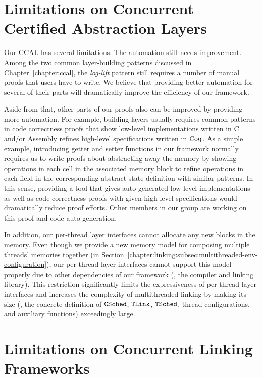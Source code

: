 \section{Limitations on Concurrent Certified Abstraction Layers}

Our CCAL has several limitations.
The automation still needs improvement. Among the two common layer-building patterns discussed in 
Chapter~\ref{chapter:ccal},
the \textit{log-lift} pattern still requires a number of manual proofs that users have to write. 
We believe that providing better automation for several of their parts will dramatically improve the efficiency of our framework.

Aside from that, other parts of our proofs also can be improved by providing more automation. 
For example, building layers usually requires common patterns in code correctness proofs that show low-level implementations written in C and/or Assembly refines high-level specifications written in $\mathrm{Coq}$. 
As a simple example, introducing getter and setter functions in our framework normally requires us to write proofs about abstracting away the memory by showing operations in each cell in the associated memory block to refine operations in each field  in the corresponding abstract state definition with similar patterns.
In this sense, providing a tool that gives auto-generated low-level implementations as well as code correctness proofs with given high-level specifications would dramatically reduce proof efforts. 
Other members in our group are working on this proof and code auto-generation.

In addition, our per-thread layer interfaces cannot allocate any new blocks in the memory. Even though we provide a new memory 
model for composing multiple threads’ memories together 
(in  Section~\ref{chapter:linking:subsec:multithreaded-env-configuration}),
our per-thread layer interfaces cannot support this model properly due to other dependencies of our framework 
(\ie, the compiler and linking library). This restriction significantly limits the expressiveness of per-thread layer interfaces 
and increases the complexity of multithreaded linking by making its size  (\ie, the concrete definition of 
${{\mathrm{\texttt{CSched}}}}$, ${{\mathrm{\texttt{TLink}}}}$, ${{\mathrm{\texttt{TSched}}}}$,  thread configurations, and auxiliary functions) exceedingly large. 



\section{Limitations on Concurrent Linking Frameworks}


